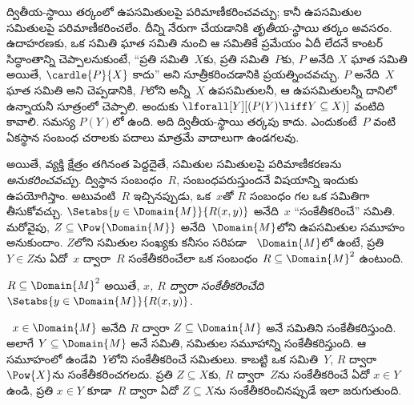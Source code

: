 \documentclass[../../../include/open-logic-section]{subfiles}
\begin{document}


\begin{explain}
ద్వితీయ-స్థాయి తర్కంలో  ఉపసమితులపై
పరిమాణీకరించవచ్చు; కానీ  ఉపసమితుల సమితులపై
పరిమాణీకరించలేం. దీన్ని నేరుగా చేయడానికి \emph{తృతీయ-స్థాయి} తర్కం
అవసరం. ఉదాహరణకు, ఒక సమితి ఘాత సమితి నుంచి ఆ సమితికే
 ప్రమేయం ఏదీ లేదనే కాంటర్ సిద్ధాంతాన్ని
చెప్పాలనుకుంటే, “ప్రతి సమితి~$X$కు, ప్రతి సమితి~$P$కు, $P$ అనేది
$X$ ఘాత సమితి అయితే, $\cardle{P}{X}$ కాదు” అని సూత్రీకరించడానికి
ప్రయత్నించవచ్చు. $P$ అనేది~$X$ ఘాత సమితి అని చెప్పడానికి,
$P$లోని  అన్నీ~$X$ ఉపసమితులనీ, ఆ ఉపసమితులన్నీ దానిలో ఉన్నాయనీ
సూత్రంలో చెప్పాలి. అందుకు $\lforall[Y][(P(Y)
  \liff Y \subseteq X)]$ వంటిది కావాలి. సమస్య $P(Y)$లో ఉంది. అది
ద్వితీయ-స్థాయి తర్కపు  కాదు. ఎందుకంటే~$P$ వంటి
ఏకస్థాన సంబంధ చరాలకు పదాలు మాత్రమే వాదాలుగా ఉండగలవు.

అయితే, వ్యక్తి క్షేత్రం తగినంత పెద్దదైతే, సమితుల సమితులపై
పరిమాణీకరణను \emph{అనుకరించవచ్చు}. ద్విస్థాన సంబంధం~$R$,
 
  సంబంధపరుస్తుందనే
విషయాన్ని ఇందుకు ఉపయోగిస్తాం. అటువంటి~$R$ ఇచ్చినప్పుడు, ఒక~$x$తో
$R$ సంబంధం గల  ఒక సమితిగా తీసుకోవచ్చు. $\Setabs{y \in
  \Domain{M}}{R(x,y)}$ అనేది~$x$ “సంకేతీకరించే” సమితి. మరోవైపు,
$Z \subseteq \Pow{\Domain{M}}$ అనేది~$\Domain{M}$లోని ఉపసమితుల
సమూహం అనుకుందాం. $Z$లోని సమితుల సంఖ్యకు కనీసం సరిపడా
~$\Domain{M}$లో ఉంటే, ప్రతి $Y \in Z$ను
ఏదో~$x$ ద్వారా~$R$ సంకేతీకరించేలా ఒక సంబంధం
$R \subseteq \Domain{M}^2$ ఉంటుంది.
\end{explain}

\begin{defn}
$R \subseteq \Domain{M}^2$ అయితే, \emph{$x$, $R$ ద్వారా
సంకేతీకరించేది} $\Setabs{y
  \in \Domain{M}}{R(x, y)}$.
\end{defn}

~$x \in \Domain{M}$ అనేది $R$ ద్వారా
$Z \subseteq \Domain{M}$ అనే సమితిని సంకేతీకరిస్తుంది. అలాగే $Y \subseteq \Domain{M}$
అనే సమితి, సమితుల సమూహాన్ని సంకేతీకరిస్తుంది. ఆ సమూహంలో ఉండేవి~$Y$లోని
 సంకేతీకరించే సమితులు.
కాబట్టి ఒక సమితి~$Y$, $R$ ద్వారా $\Pow{X}$ను సంకేతీకరించగలదు. ప్రతి
$Z \subseteq X$కు, $R$ ద్వారా~$Z$ను సంకేతీకరించే ఏదో $x \in Y$
ఉండి, ప్రతి $x \in Y$ కూడా~$R$ ద్వారా ఏదో $Z \subseteq X$ను
సంకేతీకరించినప్పుడే ఇలా జరుగుతుంది.
\end{document}
